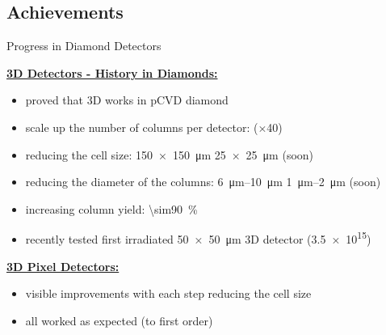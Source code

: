 \subsection{Achievements}
\begin{frame}{Progress in Diamond Detectors}

	\textbf{\underline{3D Detectors - History in Diamonds:}}\vspace*{5pt}
	\begin{itemize}\itemfill
		\item proved that 3D works in pCVD diamond
		\item scale up the number of columns per detector:  \ra {} ($\times$40)
		\item reducing the cell size: \SI{150x150}{\micro\meter} \ra {} \ra \SI{25x25}{\micro\meter} (soon)
		\item reducing the diameter of the columns: \SIrange{6}{10}{\micro\meter} \ra {} \ra \SIrange{1}{2}{\micro\meter} (soon)
		\item \ra increasing column yield: \SI{\sim90}{\%} \ra {}
		\item recently tested first irradiated \SI{50x50}{\micro\meter} 3D detector (\SI{3.5e15}{\ncm})
	\end{itemize}
	
	\vspace*{5pt}\textbf{\underline{3D Pixel Detectors:}}\vspace*{5pt}
	\begin{itemize}\itemfill
		\item visible improvements with each step reducing the cell size
		\item all worked as expected (to first order)
	\end{itemize}

\end{frame}
